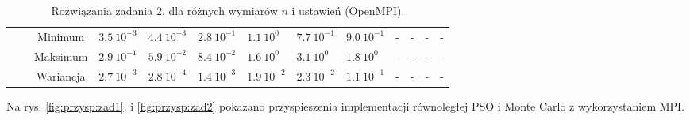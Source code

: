 \documentclass[11pt, a4paper, oneside]{article}
\begin{document}
\begin{table}[H]
\begin{adjustwidth}{-1.76cm}{}
\begin{tabular}{|c|c|c|l|l|l|l|l|l|c|c|c|c|}
                      &                               & Minimum   & $3.5 \ 10^{-3}$          & $4.4 \ 10^{-3}$         & $2.8 \ 10^{-1}$          & $1.1 \ 10^{0}$          & $7.7 \ 10^{-1}$          & $9.0 \ 10^{-1}$         & -           & -         & -           & -          \\ \cline{3-13} 
                      &                               & Maksimum  & $2.9 \ 10^{-1}$          & $5.9 \ 10^{-2}$         & $8.4 \ 10^{-2}$          & $1.6 \ 10^{0}$          & $3.1 \ 10^{0}$           & $1.8 \ 10^{0}$          & -           & -         & -           & -          \\ \cline{3-13} 
                      &                               & Wariancja & $2.7 \ 10^{-3}$          & $2.8 \ 10^{-4}$         & $1.4 \ 10^{-3}$          & $1.9 \ 10^{-2}$         & $2.3 \ 10^{-2}$          & $1.1 \ 10^{-1}$         & -           & -         & -           & -          \\ \hline
\end{tabular}
\end{adjustwidth}
\caption{Rozwiązania zadania $2$. dla różnych wymiarów $n$ i ustawień (OpenMPI).}
\label{tab:MPI:zad_2}
\end{table}

Na rys. \ref{fig:przysp:zad1}. i \ref{fig:przysp:zad2} pokazano przyspieszenia implementacji równoległej PSO i Monte Carlo z wykorzystaniem MPI. 
\end{document}
